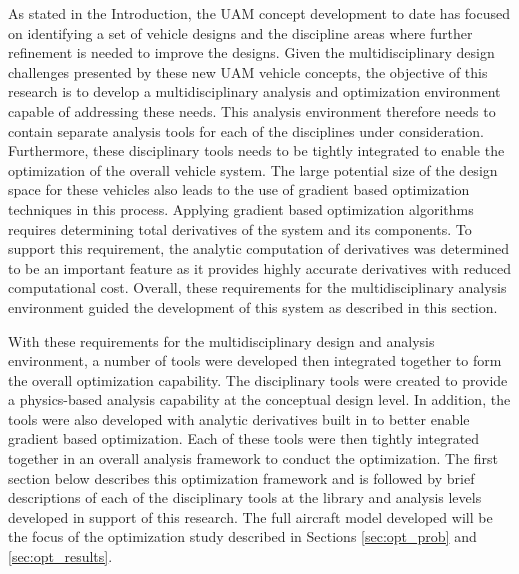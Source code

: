 
As stated in the Introduction, the UAM concept development to date has focused on identifying a set of vehicle designs and the discipline areas where further refinement is needed to improve the designs.
Given the multidisciplinary design challenges presented by these new UAM vehicle concepts, the objective of this research is to develop a multidisciplinary analysis and optimization environment capable of addressing these needs.
This analysis environment therefore needs to contain separate analysis tools for each of the disciplines under consideration.
Furthermore, these disciplinary tools needs to be tightly integrated to enable the optimization of the overall vehicle system.
The large potential size of the design space for these vehicles also leads to the use of gradient based optimization techniques in this process.
Applying gradient based optimization algorithms requires determining total derivatives of the system and its components.
To support this requirement, the analytic computation of derivatives was determined to be an important feature as it provides highly accurate derivatives with reduced computational cost.
Overall, these requirements for the multidisciplinary analysis environment guided the development of this system as described in this section.

With these requirements for the multidisciplinary design and analysis environment, a number of tools were developed then integrated together to form the overall optimization capability.
The disciplinary tools were created to provide a physics-based analysis capability at the conceptual design level.
In addition, the tools were also developed with analytic derivatives built in to better enable gradient based optimization.
Each of these tools were then tightly integrated together in an overall analysis framework to conduct the optimization.
The first section below describes this optimization framework and is followed by brief descriptions of each of the disciplinary tools at the library and analysis levels developed in support of this research. 
The full aircraft model developed will be the focus of the optimization study described in Sections \ref{sec:opt_prob} and \ref{sec:opt_results}.



